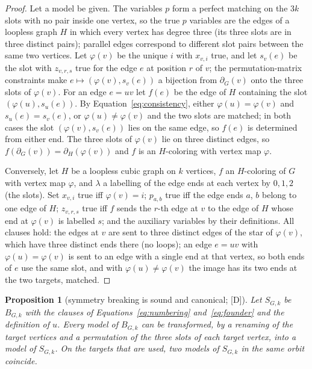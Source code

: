 \documentclass[11pt]{article}
\newtheorem{proposition}[theorem]{Proposition}
\theoremstyle{definition}
\theoremstyle{remark}
\newcommand{\evD}{\textnormal{[D]}}
\begin{document}
\begin{proof}
Let a model be given. The variables $p$ form a perfect matching on the $3k$ slots with no pair inside one vertex, so the true $p$ variables are the edges of a loopless graph $H$ in which every vertex has degree three
(its three slots are in three distinct pairs); parallel edges correspond to different slot pairs between the same two vertices. Let $\varphi(v)$ be the unique $i$ with $x_{v,i}$ true, and let $s_v(e)$ be the slot
with $z_{v,r,s}$ true for the edge $e$ at position $r$ of $v$; the permutation-matrix constraints make $e \mapsto (\varphi(v), s_v(e))$ a bijection from $\partial_G(v)$ onto the three slots of $\varphi(v)$. For an edge
$e = uv$ let $f(e)$ be the edge of $H$ containing the slot $(\varphi(u), s_u(e))$. By Equation~\eqref{eq:consistency}, either $\varphi(u) = \varphi(v)$ and $s_u(e) = s_v(e)$, or $\varphi(u) \ne \varphi(v)$ and the two
slots are matched; in both cases the slot $(\varphi(v), s_v(e))$ lies on the same edge, so $f(e)$ is determined from either end. The three slots of $\varphi(v)$ lie on three distinct edges, so
$f(\partial_G(v)) = \partial_H(\varphi(v))$ and $f$ is an $H$-coloring with vertex map $\varphi$.

Conversely, let $H$ be a loopless cubic graph on $k$ vertices, $f$ an $H$-coloring of $G$ with vertex map $\varphi$, and $\lambda$ a labelling of the edge ends at each vertex by $0,1,2$ (the slots).
Set $x_{v,i}$ true iff $\varphi(v) = i$; $p_{a,b}$ true iff the edge ends $a$, $b$ belong to one edge of $H$; $z_{v,r,s}$ true iff $f$ sends the $r$-th edge at $v$ to the edge of $H$ whose end at $\varphi(v)$ is labelled $s$;
and the auxiliary variables by their definitions. All clauses hold: the edges at $v$ are sent to three distinct edges of the star of $\varphi(v)$, which have three distinct ends there (no loops); an edge $e = uv$ with
$\varphi(u) = \varphi(v)$ is sent to an edge with a single end at that vertex, so both ends of $e$ use the same slot, and with $\varphi(u) \ne \varphi(v)$ the image has its two ends at the two targets, matched.
\end{proof}

\begin{proposition}[symmetry breaking is sound and canonical; \evD]\label{prop:symmetry}
Let $S_{G,k}$ be $B_{G,k}$ with the clauses of Equations~\eqref{eq:numbering} and~\eqref{eq:founder} and the definition of $u$. Every model of $B_{G,k}$ can be transformed, by a renaming of the target vertices and a
permutation of the three slots of each target vertex, into a model of $S_{G,k}$. On the targets that are used, two models of $S_{G,k}$ in the same orbit coincide.
\end{proposition}
\end{document}

